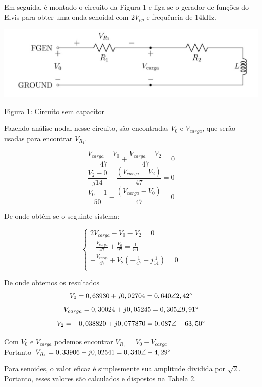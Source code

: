 \documentclass[a4 paper]{article}
\begin{document}


Em seguida, é montado o circuito da Figura 1 e liga-se o gerador de funções do Elvis para obter uma onda senoidal com 2$V_{pp}$ e frequência de 14kHz.

\begin{table}[h]
\centering
\includegraphics[scale=0.5]{figuras/figura1}
\end{table}

\begin{center}
Figura 1: Circuito sem capacitor
\end{center}

Fazendo análise nodal nesse circuito, são encontradas $V_0$ e $V_{carga}$, que serão usadas para encontrar $V_{R_1}$. 

\[\frac{V_{carga}-V_0}{47}+\frac{V_{carga}-V_2}{47}=0\]
\[\frac{V_2-0}{j14}-\frac{(V_{carga}-V_2)}{47}=0\]
\[\frac{V_0-1}{50}-\frac{(V_{carga}-V_0)}{47}=0\]


De onde obtém-se o seguinte sistema:

\begin{equation*}
\left\{
\begin{aligned}
2V_{carga}-V_0-V_2=0\\
-\frac{V_{carga}}{47} + \frac{V_0}{97} = \frac{1}{50}\\
-\frac{V_{carga}}{47} + V_2\left(-\frac{1}{47}-j\frac{1}{14}\right)=0\\
\end{aligned}\right.
\end{equation*}

\newpage
De onde obtemos os resultados 
\[V_0 = 0,63930+j0,02704=0,640\angle 2,42\text{\textdegree}\]
\[V_{carga}=0,30024+j0,05245=0,305\angle 9,91\text{\textdegree}\]
\[V_2=-0,038820+j0,077870=0,087\angle -63,50\text{\textdegree}\]

Com $V_0$ e $V_{carga}$ podemos encontrar $V_{R_1}=V_0-V_{carga}$\\
Portanto $V_{R_1}=0,33906-j0,02541=0,340\angle-4,29\text{\textdegree}$ 

Para senoides, o valor eficaz é simplesmente sua amplitude dividida por $\sqrt{2}$. Portanto, esses valores são calculados e dispostos na Tabela 2.
\end{document}
